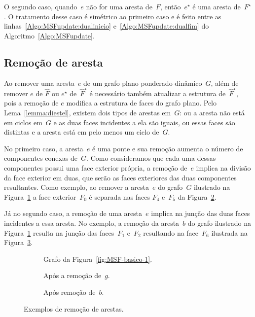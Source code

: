 O segundo caso, quando~$e$ não for uma aresta de~$F$, então~$e^\star$ é uma aresta de~$F^\star$.
O tratamento desse caso é simétrico ao primeiro caso e é feito entre as linhas~\ref{Algo:MSFupdate:dualinicio} e~\ref{Algo:MSFupdate:dualfim} do Algoritmo~\ref{Algo:MSFupdate}.


\subsection{Remoção de aresta}

Ao remover uma aresta~$e$ de um grafo plano ponderado dinâmico~$G$, além de remover $e$ de $\hat F$ ou $e^\star$ de~$\hat F^\star$ é necessário também atualizar a estrutura de~$\hat F^\star$, pois a remoção de $e$ modifica a estrutura de faces do grafo plano.
Pelo Lema~\ref{lemma:diestel}, existem dois tipos de arestas em~$G$: ou a aresta não está em ciclos em~$G$ e as duas faces incidentes a ela são iguais, ou essas faces são distintas e a aresta está em pelo menos um ciclo de~$G$.

No primeiro caso, a aresta~$e$ é uma ponte e sua remoção aumenta o número de componentes conexas de~$G$.
Como consideramos que cada uma dessas componentes possui uma face exterior própria, a remoção de~$e$ implica na divisão da face exterior em duas, que serão as faces exteriores das duas componentes resultantes.
Como exemplo, ao remover a aresta~$e$ do grafo~$G$ ilustrado na Figura~\ref{fig:MSF-basico-reprodicao} a face exterior~$F_0$ é separada nas faces $F_4$ e~$F_5$ da Figura~\ref{fig:MSF-remove-ponte}.


Já no segundo caso, a remoção de uma aresta~$e$ implica na junção das duas faces incidentes a essa aresta.
No exemplo, a remoção da aresta~$b$ do grafo ilustrado na Figura~\ref{fig:MSF-basico-reprodicao} resulta na junção das faces~$F_1$ e~$F_2$ resultando na face~$F_6$ ilustrada na Figura~\ref{fig:MSF-remove-nao-ponte}.

\begin{figure}[htb]
\begin{subfigure}{0.3\textwidth}
\scalebox{0.7}{

}
\caption{Grafo da Figura~\ref{fig:MSF-basico-1}.}
\label{fig:MSF-basico-reprodicao}
\end{subfigure}
\begin{subfigure}{0.3\textwidth}
\scalebox{0.7}{

}
\caption{Após a remoção de~$g$.}
\label{fig:MSF-remove-ponte}
\end{subfigure}
\begin{subfigure}{0.3\textwidth}
\scalebox{0.7}{

}
\caption{Após remoção de~$b$.}
\label{fig:MSF-remove-nao-ponte}
\end{subfigure}
\caption{Exemplos de remoção de arestas.}
\label{fig:antes-depois-remocao}
\end{figure}


